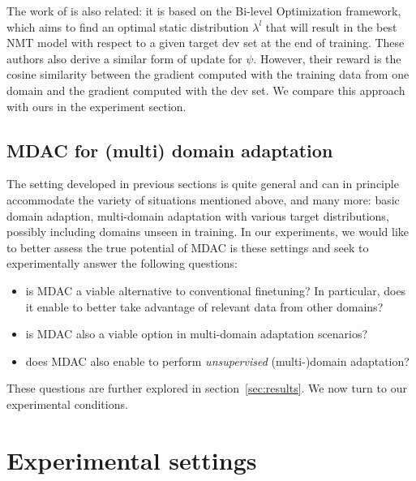 \documentclass[11pt]{article}
\newcommand{\fyDone}[1]{\done[FY]\Todo[FY:]{\textcolor{orange}{#1}}}
\begin{document}
The work of \cite{Wang20balancing} is also related: it is based on the Bi-level Optimization framework, which aims to find an optimal static distribution $\lambda^{l}$ that will result in the best NMT model with respect to a given target dev set at the end of training. These authors also derive a similar form of update for $\psi$. However, their reward is the cosine similarity between the gradient computed with the training data from one domain and the gradient computed with the dev set. We compare this approach with ours in the experiment section.

\subsection{MDAC for (multi) domain adaptation}
The setting developed in previous sections is quite general and can in principle accommodate the variety of situations mentioned above, and many more: basic domain adaption, multi-domain adaptation with various target distributions, possibly including domains unseen in training. In our experiments, we would like to better assess the true potential of MDAC is these settings and seek to experimentally answer the following questions:
\begin{itemize}
\item is MDAC a viable alternative to conventional finetuning? In particular, does it enable to better take advantage of relevant data from other domains?
\item is MDAC also a viable option in multi-domain adaptation scenarios?
\item does MDAC also enable to perform \emph{unsupervised} (multi-)domain adaptation? \fyDone{TBContinued}
\end{itemize}
These questions are further explored in section~\ref{sec:results}. We now turn to our experimental conditions.

\section{Experimental settings} \label{sec:exp}
\end{document}
